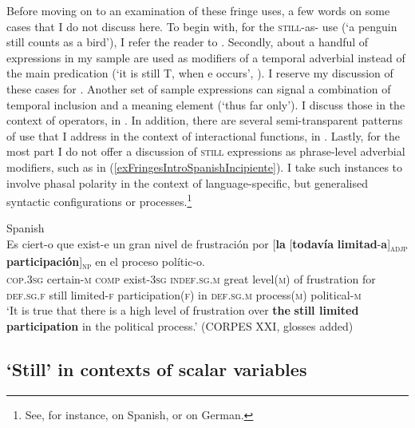 Before moving on to an examination of these fringe uses, a few words on some cases that I do not discuss here. To begin with, for the \textsc{still}-as- use (\lq a penguin still counts as a bird\rq{}), I refer the reader to .  Secondly, about a handful of expressions in my sample are used as modifiers of a temporal adverbial instead of the main predication (\lq it is still T, when e occurs\rq, \cite[202]{Loebner1989}). I reserve my discussion of these cases for . Another set of sample expressions can signal a combination of temporal inclusion and a  meaning element (\lq thus far only\rq{}). I discuss those in the context of  operators, in . In addition, there are several semi-transparent patterns of use that I address in the context of interactional functions, in . Lastly, for the most part I do not offer a discussion of \textsc{still} expressions as phrase-level adverbial modifiers, such as in (\ref{exFringesIntroSpanishIncipiente}). I take such instances to involve phasal polarity in the context of language-specific, but generalised syntactic configurations or processes.\footnote{See, for instance, \textcite[13.16l]{RAEGramatica} on Spanish, or \textcite[2091–2096]{ZifonunEtAl1997} on German.}

\begin{exe}
	\ex Spanish\label{exFringesIntroSpanishIncipiente}\\
	\gll Es ciert-o que exist-e un gran nivel de frustración por \textup{[}\textbf{la} \textup{[}\textbf{todavía} \textbf{limitad}-\textbf{a}\textup{]\textsubscript{\textsc{adjp}}} \textbf{participación}\textup{]\textsubscript{\textsc{np}}} en el proceso polític-o.\\
\textsc{cop}.3\textsc{sg} certain-\textsc{m} \textsc{comp} exist-3\textsc{sg} \textsc{indef}.\textsc{sg}.\textsc{m} great level(\textsc{m}) of frustration for \phantom{[}\textsc{def}.\textsc{sg}.\textsc{f} \phantom{[}still limited-\textsc{f} participation(\textsc{f}) in \textsc{def}.\textsc{sg}.\textsc{m} process(\textsc{m}) political-\textsc{m}\\
	\glt \lq It is true that there is a high level of frustration over \textbf{the} \textbf{still limited} \textbf{participation} in the political process.\rq{ }(CORPES XXI,  glosses added)
\end{exe}

\subsection{\lq Still\rq{ }in contexts of scalar variables}\label{sectionScalar}
